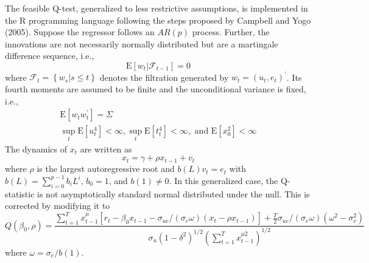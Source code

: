 \documentclass{article}
\begin{document}
The feasible Q-test, generalized to less restrictive assumptions, is implemented in the R programming language following the steps proposed by Campbell and Yogo (2005). Suppose the regressor follows an $AR(p)$ process. Further, the innovations are not necessarily normally distributed but are a martingale difference sequence, i.e., 
\begin{equation}
\mathrm{E}\left[w_{t} |\mathscr{F}_{t-1}\right]=0
\end{equation}
where $\mathscr{F}_{t}=\left\{w_{s} | s \leq t\right\}$ denotes the filtration generated by $w_{t}=\left(u_{t}, e_{t}\right)^{\prime}$.
Its fourth moments are assumed to be finite and the unconditional variance is fixed, i.e.,
\begin{equation}
\begin{array}{l}{\mathrm{E}\left[w_{t} w_{t}^{\prime}\right]=\Sigma} \\ {\sup _{t} \mathrm{E}\left[u_{t}^{4}\right]<\infty, \sup _{t} \mathrm{E}\left[t_{t}^{4}\right]<\infty, \text { and } \mathrm{E}\left[x_{0}^{2}\right]<\infty}\end{array}
\end{equation}
The dynamics of $x_{t}$ are written as
\begin{equation}
\label{eqn:22}
x_{t}=\gamma+\rho x_{t-1}+v_{t}
\end{equation}
where $\rho$ is the largest autoregressive root and $b(L) v_{t}=e_{t}$ with $b(L)=\sum_{i=0}^{p-1} b_{i} L^{i}$, $b_{0}=1$, and $b(1) \neq 0$. In this generalized case, the Q-statistic is not asymptotically standard normal distributed under the null. This is corrected by modifying it to
\begin{equation}
Q\left(\beta_{0}, \rho\right)=\frac{\sum_{t=1}^{T} x_{t-1}^{\mu}\left[r_{t}-\beta_{0} x_{t-1}-\sigma_{u e} /\left(\sigma_{e} \omega\right)\left(x_{t}-\rho x_{t-1}\right)\right]+\frac{T}{2} \sigma_{u e} /\left(\sigma_{e} \omega\right)\left(\omega^{2}-\sigma_{v}^{2}\right)}{\sigma_{u}\left(1-\delta^{2}\right)^{1 / 2}\left(\sum_{t=1}^{T} x_{t-1}^{\mu 2}\right)^{1 / 2}}
\end{equation}
where $\omega=\sigma_{e} / b(1)$.
\end{document}
